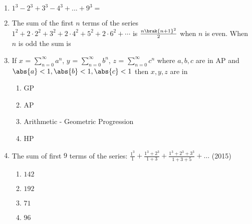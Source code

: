 \begin{enumerate}[label=\thesubsection.\arabic*,ref=\thesubsection.\theenumi]
\item {$1^{3}-2^{3}+3^{3}-4^{3}+...
+9^{3}=$}
{\hfill{}} 
\begin{enumerate}
\end{enumerate}
\item {The sum of the first $n$ terms of the series $1^2+2\cdot2^2+3^2+2\cdot4^2+5^2+2\cdot6^2+\cdots$ is $\frac{n\brak{n+1}^2}{2}$ when $n$ is even. When $n$ is odd the sum is}
{\hfill{}}
\begin{enumerate}
\end{enumerate}
\item {If $x$ = $\sum\limits_{n=0}^{\infty}a^n$, $y$ = $\sum\limits_{n=0}^{\infty}b^n$, $z$ = $\sum\limits_{n=0}^{\infty}c^n$ where $a,b,c$ are in AP and $\abs{a}<1,\abs{b}<1,\abs{c}<1$ then $x,y,z$ are in}
{\hfill{}} 
\begin{multicols}{2}
\begin{enumerate}
\item  {GP}
\item  {AP}
\item  {Arithmetic - Geometric Progression}
\item  {HP}
\end{enumerate}
\end{multicols}
    \item The sum of first $9$ terms of the series:
	    $\frac{1^3}{1}+\frac{1^3+2^3}{1+3}+\frac{1^3+2^3+3^3}{1+3+5}+\dots$
    \hfill(2015)
    \begin{multicols}{4}
\begin{enumerate}    
    \item $142$
    \item $192$
    \item $71$
    \item $96$

\end{enumerate}
\end{multicols}
\end{enumerate}
